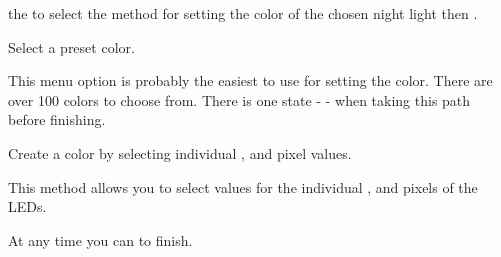  the  to select the method for setting the color of the chosen
night light then .


 \par\medskip

Select a preset color.

\par\medskip

This menu option is probably the easiest to use for setting the color.  There
are over \num{100} colors to choose from.  There is one state -  - when
taking this path before finishing.


 \par\medskip

Create a color by selecting individual ,  and  pixel
values.

\par\medskip

This method allows you to select values for the individual , 
and  pixels of the LEDs.


\pagebreak
At any time you can  to finish.


